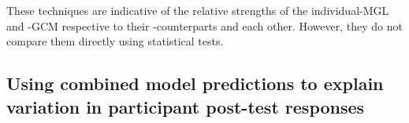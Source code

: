 \documentclass[12pt]{article}
\begin{document}
These techniques are indicative of the relative strengths of the individual-MGL and -GCM respective to their -counterparts and each other. However, they do not compare them directly using statistical tests. 

\subsection{Using combined model predictions to explain variation in participant post-test responses}



\end{document}

